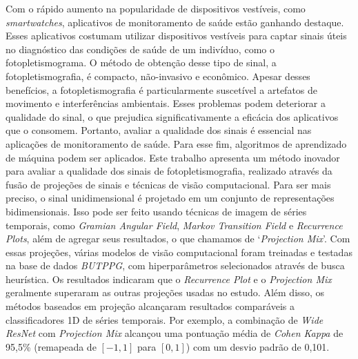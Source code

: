 Com o rápido aumento na popularidade de dispositivos vestíveis, como \textit{smartwatches}, aplicativos de monitoramento de saúde estão ganhando destaque. Esses aplicativos costumam utilizar dispositivos vestíveis para captar sinais úteis no diagnóstico das condições de saúde de um indivíduo, como o fotopletismograma. O método de obtenção desse tipo de sinal, a fotopletismografia, é compacto, não-invasivo e econômico. Apesar desses benefícios, a fotopletismografia é particularmente suscetível a artefatos de movimento e interferências ambientais. Esses problemas podem deteriorar a qualidade do sinal, o que prejudica significativamente a eficácia dos aplicativos que o consomem. Portanto, avaliar a qualidade dos sinais é essencial nas aplicações de monitoramento de saúde.
Para esse fim, algoritmos de aprendizado de máquina podem ser aplicados. Este trabalho apresenta um método inovador para avaliar a qualidade dos sinais de fotopletismografia, realizado através da fusão de projeções de sinais e técnicas de visão computacional. Para ser mais preciso, o sinal unidimensional é projetado em um conjunto de representações bidimensionais. Isso pode ser feito usando técnicas de imagem de séries temporais, como \textit{Gramian Angular Field}, \textit{Markov Transition Field} e \textit{Recurrence Plots}, além de agregar seus resultados, o que chamamos de `\textit{Projection Mix}'. Com essas projeções, várias modelos de visão computacional foram treinadas e testadas na base de dados \textit{\acrshort{BUTPPG}}, com hiperparâmetros selecionados através de busca heurística. Os resultados indicaram que o \textit{Recurrence Plot} e o \textit{Projection Mix} geralmente superaram as outras projeções usadas no estudo. Além disso, os métodos baseados em projeção alcançaram resultados comparáveis a classificadores 1D de séries temporais. Por exemplo, a combinação de \textit{Wide ResNet} com \textit{Projection Mix} alcançou uma pontuação média de \textit{Cohen Kappa} de 95,5\% (remapeada de $[-1,1]$ para $[0,1]$) com um desvio padrão de 0,101. 
